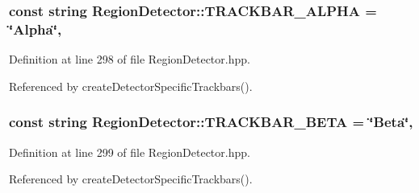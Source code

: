 \hypertarget{classmultiscale_1_1analysis_1_1RegionDetector_a5513e029d4d4cf249aa40364489f7a85}{
\subsubsection[{T\-R\-A\-C\-K\-B\-A\-R\-\_\-\-A\-L\-P\-H\-A}]{\setlength{\rightskip}{0pt plus 5cm}const string Region\-Detector\-::\-T\-R\-A\-C\-K\-B\-A\-R\-\_\-\-A\-L\-P\-H\-A = \char`\"{}Alpha\char`\"{}\hspace{0.3cm}{\ttfamily [static]}, {\ttfamily [private]}}}\label{classmultiscale_1_1analysis_1_1RegionDetector_a5513e029d4d4cf249aa40364489f7a85}


Definition at line 298 of file Region\-Detector.\-hpp.



Referenced by create\-Detector\-Specific\-Trackbars().

\hypertarget{classmultiscale_1_1analysis_1_1RegionDetector_a79d7878ed55bf12a87637896a1f44e37}{
\subsubsection[{T\-R\-A\-C\-K\-B\-A\-R\-\_\-\-B\-E\-T\-A}]{\setlength{\rightskip}{0pt plus 5cm}const string Region\-Detector\-::\-T\-R\-A\-C\-K\-B\-A\-R\-\_\-\-B\-E\-T\-A = \char`\"{}Beta\char`\"{}\hspace{0.3cm}{\ttfamily [static]}, {\ttfamily [private]}}}\label{classmultiscale_1_1analysis_1_1RegionDetector_a79d7878ed55bf12a87637896a1f44e37}


Definition at line 299 of file Region\-Detector.\-hpp.



Referenced by create\-Detector\-Specific\-Trackbars().

